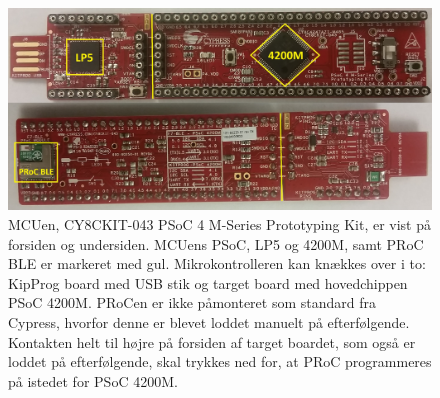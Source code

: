\begin{figure}[H]
	\centering
	\includegraphics[scale=0.15]{figures/bProblemloesning/PSoC3.jpg}
	\caption{MCUen, CY8CKIT-043 PSoC 4 M-Series Prototyping Kit, er vist på forsiden og undersiden. MCUens PSoC, LP5 og 4200M, samt PRoC BLE er markeret med gul.\newline
	Mikrokontrolleren kan knækkes over i to: KipProg board med USB stik og target board med hovedchippen PSoC 4200M. PRoCen er ikke påmonteret som standard fra Cypress, hvorfor denne er blevet loddet manuelt på efterfølgende. Kontakten helt til højre på forsiden af target boardet, som også er loddet på efterfølgende, skal trykkes ned for, at PRoC programmeres på istedet for PSoC 4200M. \citep{CYPRESS2016PSoC,Semiconductor2016}}
	\label{fig:PSoC}
\end{figure}\vspace{-0.2cm}


